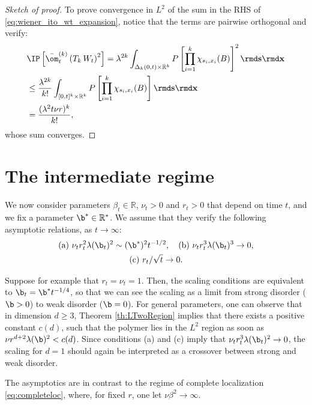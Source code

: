 \begin{proof}[Sketch of proof]
To prove convergence in $L^2$ of the sum in the RHS of \eqref{eq:wiener_ito_wt_expansion}, notice that the terms are pairwise orthogonal and verify:
\begin{align*}
&\IP\left[ \bar{\om}^{(k)}_t \left(T_k \, W_t\right)^2\right] = \lambda^{2k}\int_{\Delta_k(0,t)\times \mathbb{R}^k} P\left[\prod_{i=1}^k \chi_{s_i,x_i}(B) \right]^2\rmd \mathbf{s} \rmd \mathbf{x} \\
&\leq \frac{\lambda^{2k}}{k!} \int_{[0,t]^k\times \mathbb{R}^k} P\left[\prod_{i=1}^k \chi_{s_i,x_i}(B) \right]\rmd \mathbf{s} \rmd \mathbf{x}\\
&= \frac{(\lambda^{2}t\nu r)^k}{k!},
\end{align*}
whose sum converges.
\end{proof}

\section{The intermediate regime} \label{sec:intermediate_regime}
We now consider parameters $\beta_t\in\mathbb{R}$, $\nu_t > 0$ and $r_t > 0$ that depend on time $t$, and we fix a parameter $\b^*\in\mathbb{R}^*$. We assume that they verify the following asymptotic relations, as $t\to\infty$:
\begin{equation} \label{eq:paramRI}
\begin{gathered}
\text{(a)} \  \nu_t r_t^2 \lambda(\b_t)^2 \sim (\b^*)^{2}t^{-1/2}, \quad \text{(b)} \  \nu_t r_t^3 \lambda(\b_t)^3 \to 0,\\
\text{(c)} \  r_t/\sqrt{t} \to 0.
\end{gathered}
\end{equation}

Suppose for example that $r_t = \nu_t = 1$. Then, the scaling conditions are equivalent to $\b_t = \b^* t^{-1/4}$, so that we can see the scaling as a limit from strong disorder ($\b>0$) to weak disorder ($\b=0$). For general parameters, one can observe that in dimension $d\geq 3$, Theorem \ref{th:LTwoRegion} implies that there exists a positive constant $c(d)$, such that the polymer lies in the $L^2$ region as soon as
$\nu r^{d+2} \lambda(\b)^2 < c(d)$.  Since conditions (a) and (c) imply that $\nu_t r_t^3 \lambda(\b_t)^2 \to 0$, the scaling for $d=1$ should again be interpreted as a crossover between strong and weak disorder.

\begin{remark}
The asymptotics are in contrast to the regime of  complete localization \eqref{eq:completeloc}, where, for fixed $r$, one let $\nu \beta^2 \to \infty$.
\end{remark}

